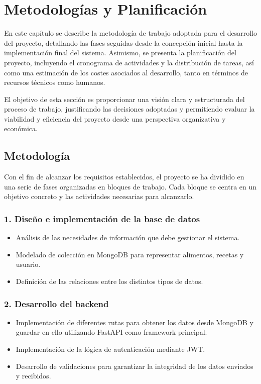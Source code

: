 \chapter{Metodologías y Planificación}\label{capitulo4}
En este capítulo se describe la metodología de trabajo adoptada para el desarrollo del proyecto, detallando las fases seguidas desde la concepción inicial hasta la implementación final del sistema. Asimismo, se presenta la planificación del proyecto, incluyendo el cronograma de actividades y la distribución de tareas, así como una estimación de los costes asociados al desarrollo, tanto en términos de recursos técnicos como humanos.

El objetivo de esta sección es proporcionar una visión clara y estructurada del proceso de trabajo, justificando las decisiones adoptadas y permitiendo evaluar la viabilidad y eficiencia del proyecto desde una perspectiva organizativa y económica.

\section{Metodología}
Con el fin de alcanzar los requisitos establecidos, el proyecto se ha dividido en una serie de fases organizadas en bloques de trabajo. Cada bloque se centra en un objetivo concreto y las actividades necesarias para alcanzarlo.

\subsection*{1. Diseño e implementación de la base de datos}
\begin{itemize}
    \item Análisis de las necesidades de información que debe gestionar el sistema.
    \item Modelado de colección en MongoDB para representar alimentos, recetas y usuario.
    \item Definición de las relaciones entre los distintos tipos de datos.
\end{itemize}

\subsection*{2. Desarrollo del backend}
\begin{itemize}
    \item Implementación de diferentes rutas para obtener los datos desde MongoDB y guardar en ello utilizando FastAPI como framework principal.
    \item Implementación de la lógica de autenticación mediante JWT.
    \item Desarrollo de validaciones para garantizar la integridad de los datos enviados y recibidos.
\end{itemize}

